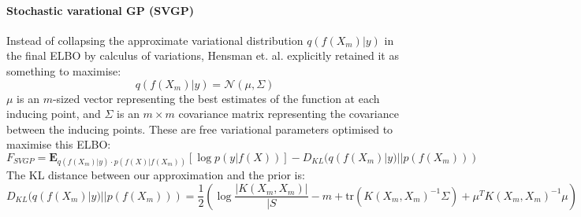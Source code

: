 \paragraph{Stochastic varational GP (SVGP)}
Instead of collapsing the approximate variational distribution $q(f(X_m) | y)$ in the final ELBO by calculus of variations, Hensman et. al. \cite{svgp} explicitly retained it as something to maximise:
\begin{equation*}
    q(f(X_m) | y) = \mathcal{N}(\mu, \Sigma)
\end{equation*}
$\mu$ is an $m$-sized vector representing the best estimates of the function at each inducing point, and $\Sigma$ is an $m \times m$ covariance matrix representing the covariance between the inducing points. These are free variational parameters optimised to maximise this ELBO:
\begin{equation*}
    F_{SVGP} = \textbf{E}_{q(f(X_m) | y) \cdot p(f(X) | f(X_m))} \left[ \log p(y | f(X)) \right] - D_{KL}(q(f(X_m) | y) || p(f(X_m)))
\end{equation*}
The KL distance between our approximation and the prior is:
\begin{equation*}
    D_{KL}(q(f(X_m) | y) || p(f(X_m))) = \frac{1}{2} \left( \log \frac{|K(X_m, X_m)|}{|S} - m + \text{tr}(K(X_m, X_m)^{-1} \Sigma) + \mu^T K(X_m, X_m)^{-1} \mu \right)
\end{equation*}

